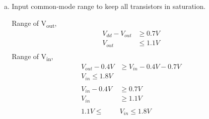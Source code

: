 \documentclass{article}
\begin{document}
\begin{enumerate}[(a)]
\item Input common-mode range to keep all transistors in saturation.

Range of V\textsubscript{out},
\begin{equation*}
\begin{aligned}
V_{dd} - V_{out} &\geq 0.7 V \\
V_{out} &\leq 1.1 V \\
\end{aligned}
\end{equation*}
Range of V\textsubscript{in},
\begin{equation*}
\begin{aligned}
V_{out} - 0.4V &\geq V_{in} - 0.4 V - 0.7 V\\
V_{in} \leq 1.8 V \\
\\
V_{in} - 0.4 V &\geq 0.7 V \\
V_{in} &\geq 1.1 V \\
\\
1.1 V \leq &V_{in} \leq 1.8 V \\
\end{aligned}
\end{equation*}
\end{enumerate}
\end{document}
